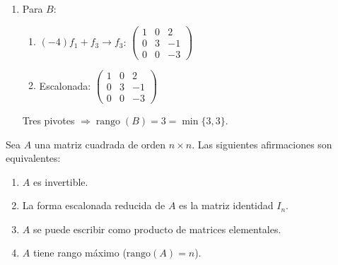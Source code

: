 \begin{example}
\begin{myproof}
\begin{enumerate}
\item Para $B:$
\begin{enumerate}
\item \( (-4)f_1 + f_3 \to f_3 \): \(\begin{pmatrix} 1 & 0 & 2 \\ 0 & \boxed{3} & -1 \\ 0 & 0 & -3 \end{pmatrix}\)
\item Escalonada: \(\begin{pmatrix} \boxed{1} & 0 & 2 \\ 0 & \boxed{3} & -1 \\ 0 & 0 & \boxed{-3} \end{pmatrix}\)
\end{enumerate}
Tres pivotes \(\Rightarrow \operatorname{rango}(B) = 3 = \min\{3,3\}\).
\end{enumerate}
\end{myproof}
\end{example}

\begin{theorem}\label{thm:invertible-equiv}
Sea $A$ una matriz cuadrada de orden $n \times n$. Las siguientes afirmaciones son equivalentes:
\begin{enumerate}
    \item $A$ es invertible.
    \item La forma escalonada reducida de $A$ es la matriz identidad $I_n$.
    \item $A$ se puede escribir como producto de matrices elementales.
    \item $A$ tiene rango máximo ($\text{rango}(A) = n$).
\end{enumerate}
\end{theorem}

